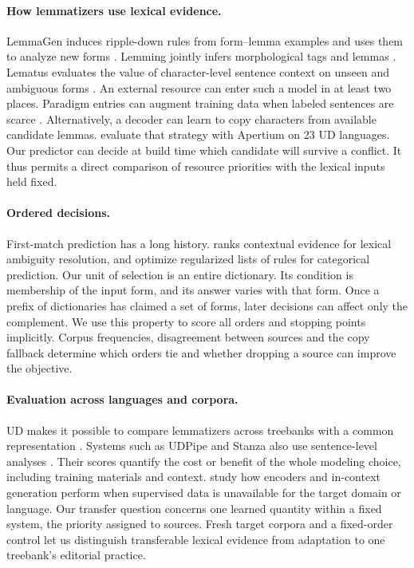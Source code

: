 \documentclass[11pt]{article}
\begin{document}
\paragraph{How lemmatizers use lexical evidence.}
LemmaGen induces ripple-down rules from form--lemma examples and uses them
to analyze new forms \citep{jursic-etal-2010-lemmagen}. Lemming jointly
infers morphological tags and lemmas \citep{muller-etal-2015-joint}.
Lematus evaluates the value of character-level sentence context on unseen and
ambiguous forms \citep{bergmanis-goldwater-2018-context}. An external resource
can enter such a model in at least two places. Paradigm entries can augment
training data when labeled sentences are scarce
\citep{bergmanis-goldwater-2019-data}. Alternatively, a decoder can learn
to copy characters from available candidate lemmas.
\citet{milintsevich-sirts-2021-enhancing} evaluate that strategy with
Apertium on 23 UD languages. Our predictor can decide at build time which
candidate will survive a conflict. It thus permits a direct comparison of
resource priorities with the lexical inputs held fixed.

\paragraph{Ordered decisions.}
First-match prediction has a long history. \citet{yarowsky-1994-decision}
ranks contextual evidence for lexical ambiguity resolution, and
\citet{angelino-etal-2018-rulelists} optimize regularized lists of rules for
categorical prediction. Our unit of selection is an entire dictionary. Its
condition is membership of the input form, and its answer varies with that
form. Once a prefix of dictionaries has claimed a set of forms, later
decisions can affect only the complement. We use this property to score all
orders and stopping points implicitly. Corpus frequencies, disagreement
between sources and the copy fallback determine which orders tie and whether
dropping a source can improve the objective.

\paragraph{Evaluation across languages and corpora.}
UD makes it possible to compare lemmatizers across treebanks with a common
representation \citep{nivre-etal-2020-universal}. Systems such as UDPipe and
Stanza also use sentence-level analyses
\citep{straka-strakova-2017-tokenizing,qi-etal-2020-stanza}. Their scores
quantify the cost or benefit of the whole modeling choice, including training
materials and context. \citet{toporkov-etal-2025-lemma} study how encoders and
in-context generation perform when supervised data is unavailable for the
target domain or language. Our transfer question concerns one learned quantity
within a fixed system, the priority assigned to sources. Fresh target corpora
and a fixed-order control let us distinguish transferable lexical
evidence from adaptation to one treebank's editorial practice.
\end{document}
